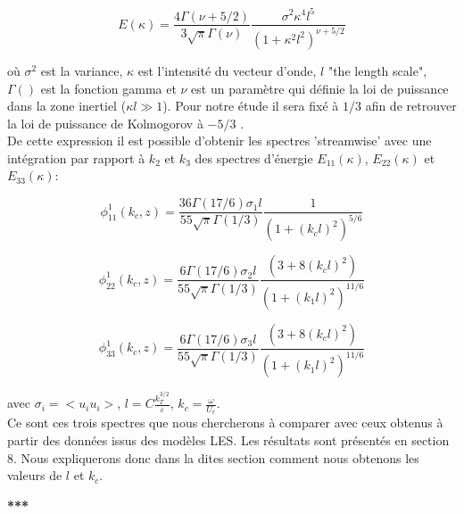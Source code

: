 \documentclass[12pt]{article}
\theoremstyle{plain}
\theoremstyle{remark}
\begin{document}
	\begin{equation}
		E(\kappa) = \frac{4\Gamma(\nu + 5/2)}{3\sqrt{\pi}\Gamma(\nu)}\frac{\sigma^2\kappa^4l^5}{(1+\kappa^2l^2)^{\nu + 5/2}}
		\label{energie_spectra_2}
	\end{equation}

	où $\sigma^2$ est la variance, $\kappa$ est l'intensité du vecteur d'onde, $l$ "the length scale", $\Gamma()$ est la fonction gamma et $\nu$ est un paramètre qui définie la loi de puissance dans la zone inertiel ($\kappa l \gg 1$). Pour notre étude il sera fixé à $1/3$ afin de retrouver la loi de puissance de Kolmogorov à $-5/3$ \cite{kolmogorov1991local}. \\

	De cette expression il est possible d'obtenir les spectres 'streamwise' avec une intégration par rapport à $k_2$ et $k_3$ des spectres d'énergie $E_{11}(\kappa)$, $E_{22}(\kappa)$ et $E_{33}(\kappa)$:
	
	\begin{equation}
		\phi_{11}^1(k_c,z) = \frac{36\Gamma(17/6)\sigma_1l}{55\sqrt{\pi}\Gamma(1/3)}\frac{1}{(1 + (k_cl)^2)^{5/6}}
		\label{eq:phi_vk_1}
	\end{equation}

	\begin{equation}
		\phi_{22}^1(k_c,z) = \frac{6\Gamma(17/6)\sigma_2l}{55\sqrt{\pi}\Gamma(1/3)}\frac{(3+8(k_cl)^2)}{(1 + (k_1l)^2)^{11/6}}
		\label{eq:phi_vk_2}
	\end{equation}

	\begin{equation}
		\phi_{33}^1(k_c,z) = \frac{6\Gamma(17/6)\sigma_3l}{55\sqrt{\pi}\Gamma(1/3)}\frac{(3+8(k_cl)^2)}{(1 + (k_1l)^2)^{11/6}}
		\label{eq:phi_vk_3}
	\end{equation}

	avec $\sigma_i = <u_iu_i>$, $l=C\frac{k_T^{3/2}}{\varepsilon}$, $k_c = \frac{\omega}{U_c}$.\\
	
	Ce sont ces trois spectres que nous chercherons à comparer avec ceux obtenus à partir des données issus des modèles LES. Les résultats sont présentés en section $8$. Nous expliquerons donc dans la dites section comment nous obtenons les valeurs de $l$ et $k_c$.
	
	
		 
\begin{center}
	\large \bf{***}
\end{center}

\vspace{0.3cm}	
\end{document}

